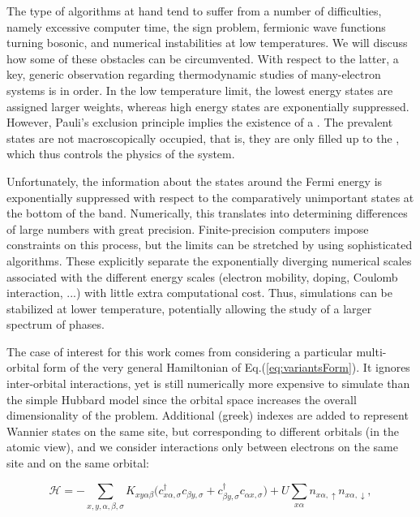 The type of algorithms at hand tend to suffer from a number of difficulties, namely excessive computer time, the sign problem, fermionic wave functions turning bosonic, and numerical instabilities at low temperatures.
We will discuss how some of these obstacles can be circumvented.
With respect to the latter, a key, generic observation regarding thermodynamic studies of many-electron systems is in order.
In the low temperature limit, the lowest energy states are assigned larger weights, whereas high energy states are exponentially suppressed.
However, Pauli's exclusion principle implies the existence of a .
The prevalent states are not macroscopically occupied, that is, they are only filled up to the , which thus controls the physics of the system.

Unfortunately, the information about the states around the Fermi energy is exponentially suppressed with respect to the comparatively unimportant states at the bottom of the band.
Numerically, this translates into determining differences of large numbers with great precision.
Finite-precision computers impose constraints on this process, but the limits can be stretched by using sophisticated algorithms.
These explicitly separate the exponentially diverging numerical scales associated with the different energy scales (electron mobility, doping, Coulomb interaction, ...) with little extra computational cost.
Thus, simulations can be stabilized at lower temperature, potentially allowing the study of a larger spectrum of phases.

The case of interest for this work comes from considering a particular multi-orbital form of the very general Hamiltonian of Eq.(\ref{eq:variantsForm}).
It ignores inter-orbital interactions, yet is still numerically more expensive to simulate than the simple Hubbard model since the orbital space increases the overall dimensionality of the problem.
Additional (greek) indexes are added to represent Wannier states on the same site, but corresponding to different orbitals (in the atomic view), and we consider interactions only between electrons on the same site and on the same orbital:

\begin{equation}\label{eq:variantTMD}
\mathcal{H} = - \sum_{x, y, \alpha, \beta,  \sigma} K_{xy\alpha\beta} \bigg( c_{x\alpha, \sigma}^\dagger c_{\beta y, \sigma} + c_{\beta y, \sigma}^\dagger c_{\alpha x, \sigma} \bigg) + U \sum_{x \alpha} n_{x\alpha, \uparrow} n_{x\alpha, \downarrow} ,
\end{equation}

